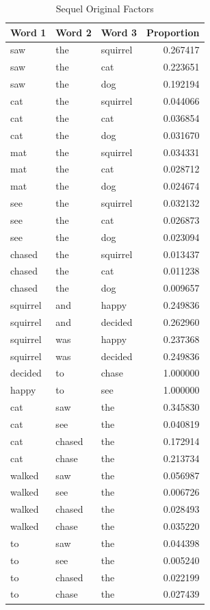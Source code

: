 \documentclass[../ut-dissertation.tex]{subfiles}
\begin{document}
\begin{table}[p]
  \centering
  \caption{Sequel Original Factors}\label{tab:sequel_original}
  \begin{tabular}{|lll|r|}
    \hline
    Word 1 & Word 2 & Word 3 & Proportion \\
    \hline
    saw & the & squirrel & 0.267417\\
    saw & the & cat & 0.223651\\
    saw & the & dog & 0.192194\\
    cat & the & squirrel & 0.044066\\
    cat & the & cat & 0.036854\\
    cat & the & dog & 0.031670\\
    mat & the & squirrel & 0.034331\\
    mat & the & cat & 0.028712\\
    mat & the & dog & 0.024674\\
    see & the & squirrel & 0.032132\\
    see & the & cat & 0.026873\\
    see & the & dog & 0.023094\\
    chased & the & squirrel & 0.013437\\
    chased & the & cat & 0.011238\\
    chased & the & dog & 0.009657\\
    \hline
    squirrel & and & happy & 0.249836\\
    squirrel & and & decided & 0.262960\\
    squirrel & was & happy & 0.237368\\
    squirrel & was & decided & 0.249836\\
    \hline
    decided & to & chase & 1.000000\\
    \hline
    happy & to & see & 1.000000\\
    \hline
    cat & saw & the & 0.345830\\
    cat & see & the & 0.040819\\
    cat & chased & the & 0.172914\\
    cat & chase & the & 0.213734\\
    walked & saw & the & 0.056987\\
    walked & see & the & 0.006726\\
    walked & chased & the & 0.028493\\
    walked & chase & the & 0.035220\\
    to & saw & the & 0.044398\\
    to & see & the & 0.005240\\
    to & chased & the & 0.022199\\
    to & chase & the & 0.027439\\
    \hline
  \end{tabular}
\end{table}
\end{document}
